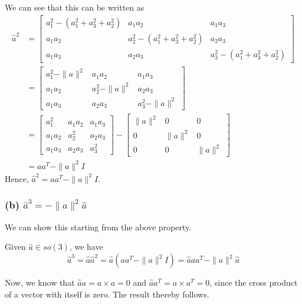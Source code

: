 We can see that this can be written as
\begin{align*}
     \hat{a}^{2}
      & =
     \begin{bmatrix}
          a_{1}^{2}-(a_{1}^{2}+a_{3}^{2}+a_{2}^{2}) & a_{1} a_{2}                               & a_{1} a_{3}                               \\
          a_{1} a_{2}                               & a_{2}^{2}-(a_{1}^{2}+a_{3}^{2}+a_{2}^{2}) & a_{2} a_{3}                               \\
          a_{1} a_{3}                               & a_{2} a_{3}                               & a_{3}^{2}-(a_{1}^{2}+a_{3}^{2}+a_{2}^{2})
     \end{bmatrix}
     \\ & =
     \begin{bmatrix}
          a_{1}^{2}-\|a\|^{2} & a_{1} a_{2}         & a_{1} a_{3}         \\
          a_{1} a_{2}         & a_{2}^{2}-\|a\|^{2} & a_{2} a_{3}         \\
          a_{1} a_{3}         & a_{2} a_{3}         & a_{3}^{2}-\|a\|^{2}
     \end{bmatrix}
     \\ & =
     \begin{bmatrix}
          a_{1}^{2}   & a_{1} a_{2} & a_{1} a_{3} \\
          a_{1} a_{2} & a_{2}^{2}   & a_{2} a_{3} \\
          a_{1} a_{3} & a_{2} a_{3} & a_{3}^{2}
     \end{bmatrix}
     -
     \begin{bmatrix}
          \|a\|^{2} & 0         & 0         \\
          0         & \|a\|^{2} & 0         \\
          0         & 0         & \|a\|^{2}
     \end{bmatrix}
     \\ & =
     a a^{T}-\|a\|^{2} I
\end{align*}
Hence, \( \hat{a}^{2}=a a^{T}-\|a\|^{2} I \).

\subsubsection*{(b) \( \hat{a}^{3}=-\|a\|^{2} \hat{a} \)}

We can show this starting from the above property.

Given \( \hat{a} \in s o(3) \), we have
\[
     \hat{a}^{3}
     =
     \hat{a} \hat{a}^{2}
     =
     \hat{a} (a a^{T}-\|a\|^{2} I)
     =
     \hat{a} a a^{T}-\|a\|^{2} \hat{a}
\]

Now, we know that \( \hat{a} a = a \times a = 0 \) and \( \hat{a} a^{T} = a \times a^{T} = 0 \), since the cross product of a vector with itself is zero.
The result thereby follows.
